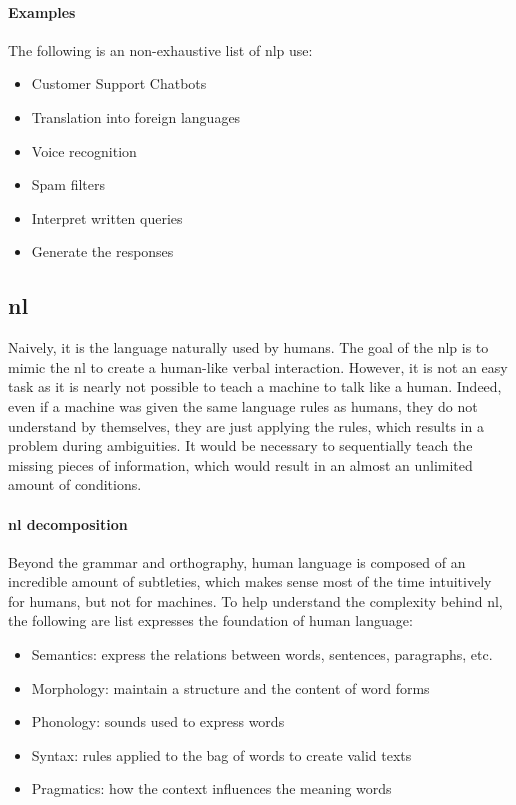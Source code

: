\paragraph{Examples}
The following is an non-exhaustive list of \gls{nlp} use:
\begin{itemize}
    \setlength\itemsep{0em}
    \item Customer Support Chatbots
    \item Translation into foreign languages
    \item Voice recognition
    \item Spam filters
    \item Interpret written queries
    \item Generate the responses
\end{itemize}

\subsection{\gls{nl}}
Naively, it is the language naturally used by humans. The goal of the \gls{nlp} is to mimic the \gls{nl} to create a human-like verbal interaction. However, it is not an easy task as it is nearly not possible to teach a machine to talk like a human. Indeed, even if a machine was given the same language rules as humans, they do not understand by themselves, they are just applying the rules, which results in a problem during ambiguities. It would be necessary to sequentially teach the missing pieces of information, which would result in an almost an unlimited amount of conditions.

\paragraph{\gls{nl} decomposition}
Beyond the grammar and orthography, human language is composed of an incredible amount of subtleties, which makes sense most of the time intuitively for humans, but not for machines. To help understand the complexity behind \gls{nl}, the following are list expresses the foundation of human language:

\begin{itemize}
    \setlength\itemsep{0em}
    \item Semantics: express the relations between words, sentences, paragraphs, etc.
    \item Morphology: maintain a structure and the content of word forms
    \item Phonology: sounds used to express words
    \item Syntax: rules applied to the bag of words to create valid texts
    \item Pragmatics: how the context influences the meaning words
\end{itemize}



